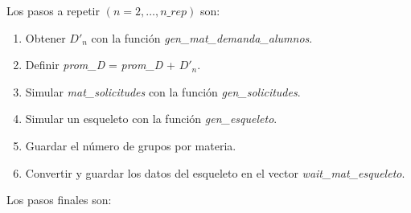 

Los pasos a repetir $(n = 2, \ldots, \textit{n\_rep})$ son:

\begin{enumerate}
\item Obtener $D'_{n}$ con la función \textit{gen\_mat\_demanda\_alumnos}.

\item Definir \textit{prom\_D} = \textit{prom\_D} + $D'_{n}$.

\item Simular \textit{mat\_solicitudes} con la función \textit{gen\_solicitudes}.

\item Simular un esqueleto con la función \textit{gen\_esqueleto}.

\item Guardar el número de grupos por materia.

\item Convertir y guardar los datos del esqueleto en el vector \textit{wait\_mat\_esqueleto}.
\end{enumerate}

Los pasos finales son:

